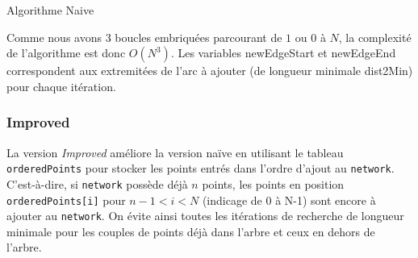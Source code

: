 \documentclass[10pt,a4paper]{article}
\begin{document}
\begin{algorithm}[H]
    \caption{Algorithme Naive}
\end{algorithm}

Comme nous avons 3 boucles embriquées parcourant de $1$ ou $0$ à $N$, la complexité de l'algorithme est donc $O(N^3)$.
Les variables newEdgeStart et newEdgeEnd correspondent aux extremitées de l'arc à ajouter (de longueur minimale dist2Min) pour chaque itération.

\subsubsection{Improved}

La version \emph{Improved} améliore la version naïve en utilisant le tableau \texttt{orderedPoints} pour stocker les points entrés dans l'ordre d'ajout au \texttt{network}. C'est-à-dire, si \texttt{network} possède déjà $n$ points, les points en position \texttt{orderedPoints[i]} pour $n-1 < i <N$ (indicage de 0 à N-1) sont encore à ajouter au \texttt{network}. On évite ainsi toutes les itérations de recherche de longueur minimale pour les couples de points déjà dans l'arbre et ceux en dehors de l'arbre.
\end{document}
